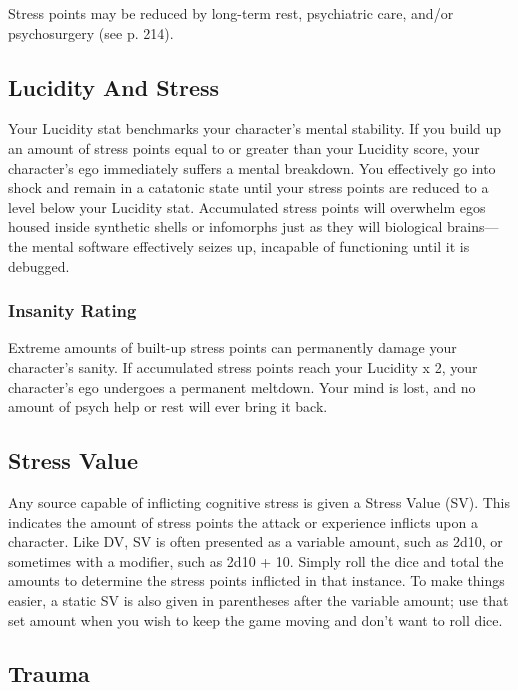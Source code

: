 Stress points may be reduced by long-term rest, psychiatric
care, and/or psychosurgery (see p. 214).

\subsection{Lucidity And Stress}

Your Lucidity stat benchmarks your character's mental 
stability. If you build up an amount of stress points 
equal to or greater than your Lucidity score, your character's
ego immediately suffers a mental breakdown.
You effectively go into shock and remain in a catatonic 
state until your stress points are reduced to a level 
below your Lucidity stat. Accumulated stress points 
will overwhelm egos housed inside synthetic shells or 
infomorphs just as they will biological brains—the 
mental software effectively seizes up, incapable of 
functioning until it is debugged.

\subsubsection{Insanity Rating}

Extreme amounts of built-up stress points can permanently
damage your character's sanity. If accumulated
stress points reach your Lucidity x 2, your character's 
ego undergoes a permanent meltdown. Your mind is 
lost, and no amount of psych help or rest will ever 
bring it back.

\subsection{Stress Value}

Any source capable of inflicting cognitive stress is given 
a Stress Value (SV). This indicates the amount of stress 
points the attack or experience inflicts upon a character. 
Like DV, SV is often presented as a variable amount, such 
as 2d10, or sometimes with a modifier, such as 2d10 + 
10. Simply roll the dice and total the amounts to determine
the stress points inflicted in that instance. To make
things easier, a static SV is also given in parentheses after 
the variable amount; use that set amount when you wish 
to keep the game moving and don't want to roll dice.

\subsection{Trauma}

